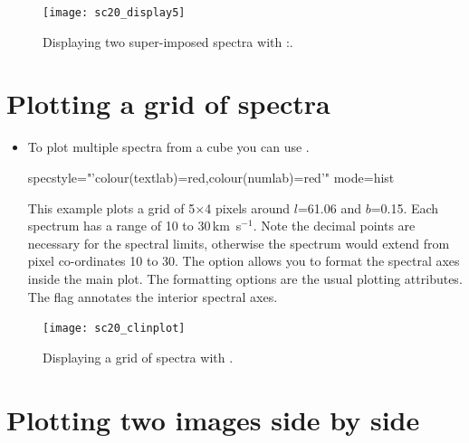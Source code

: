 \documentclass[11pt,oneside,chapters]{starlink}
\newcommand{\udeg}{\hspace{-0.3em}\dgs\hspace{-0.08em}}
\newcommand{\kms}{\mbox{$\,$km~s$^{-1}$}}   %
\newcommand{\udeg}{\HCode{&deg}}
\newcommand{\kms}{\,km~s$^{-1}$}   %
\begin{document}
\begin{figure}[h!]
\begin{center}
\texttt{[image: sc20\_display5]}
\caption[Displaying two super-imposed spectra with \Kappa:\linplot.]{\label{fig:display5}
  Displaying two super-imposed spectra with \Kappa:\linplot.}
\end{center}
\end{figure}


\section{Plotting a grid of spectra}
\begin{itemize}
\item To plot multiple spectra from a cube you can use \clinplot.

\begin{terminalv}
  specstyle="'colour(textlab)=red,colour(numlab)=red'" mode=hist
\end{terminalv}

This example plots a grid of 5$\times$4 pixels around $l$=61.\udeg06
and $b$=0.\udeg15. Each spectrum has a range of 10 to 30\kms.  Note
the decimal points are necessary for the spectral limits, otherwise
the spectrum would extend from pixel co-ordinates 10 to 30.  The
 option allows you to format the spectral axes inside
the main plot. The formatting options are the usual plotting
attributes.  The flag  annotates the interior spectral
axes.

\end{itemize}

\begin{figure}[h!]
\begin{center}
\texttt{[image: sc20\_clinplot]}
\caption[Displaying a grid of spectra with \clinplot.]{\label{fig:display6}
  Displaying a grid of spectra with \clinplot.}
\end{center}
\end{figure}


\section{Plotting two images side by side}
\end{document}
